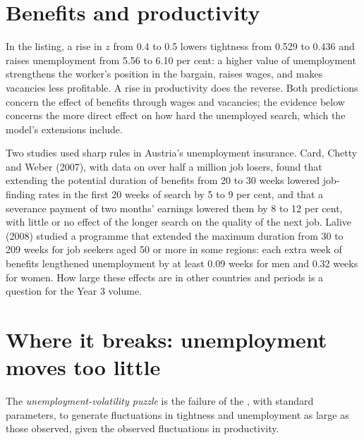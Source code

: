 \section{Benefits and productivity}\label{sec:b2:search-and-unemployment:benefits}

In the listing, a rise in $z$ from 0.4 to 0.5 lowers tightness from 0.529 to 0.436 and raises unemployment from 5.56 to 6.10 per cent: a
higher value of unemployment strengthens the worker's position in the bargain, raises wages, and makes vacancies less
profitable. A rise in productivity does the reverse. Both predictions concern the effect of benefits through wages and
vacancies; the evidence below concerns the more direct effect on how hard the unemployed search, which the model's extensions
include.

\begin{record}
Two studies used sharp rules in Austria's unemployment insurance. Card, Chetty and Weber (2007), with data on over half a
million job losers, found that extending the potential duration of benefits from 20 to 30 weeks lowered job-finding rates in the
first 20 weeks of search by 5 to 9 per cent, and that a severance payment of two months' earnings lowered them by 8 to 12 per cent, with
little or no effect of the longer search on the quality of the next job. Lalive (2008) studied a programme that extended
the maximum duration from 30 to 209 weeks for job seekers aged 50 or more in some regions: each extra week of benefits
lengthened unemployment by at least 0.09 weeks for men and 0.32 weeks for women. How large these effects are in other countries
and periods is a question for the Year 3 volume.
\end{record}

\section{Where it breaks: unemployment moves too little}\label{sec:b2:search-and-unemployment:puzzle}

\begin{definition}\label{def:b2:search-and-unemployment:volatility-puzzle}
The \emph{unemployment-volatility puzzle} is the failure of the
, with standard parameters, to generate fluctuations in tightness and unemployment as
large as those observed, given the observed fluctuations in productivity.
\end{definition}

